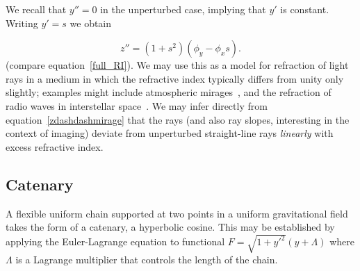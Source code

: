 \documentclass[pdflatex,sn-mathphys-num]{sn-jnl}%
\theoremstyle{thmstyleone}%
\theoremstyle{thmstyletwo}%
\theoremstyle{thmstylethree}%
\begin{document}
We recall that $y'' = 0$ in the unperturbed case, implying that $y'$
is constant.  Writing $y'= s$ we obtain

\begin{equation}
  z'' = (1+s^2)(\phi_y-\phi_xs).\label{zdashdashmirage}
\end{equation}
%
(compare equation~\ref{full_RI}).  We may use this as a model for
refraction of light rays in a medium in which the refractive index
typically differs from unity only slightly; examples might include
atmospheric mirages~\cite{trankle1999}, and the refraction of radio
waves in interstellar space~\cite{romani1986}.  We may infer directly
from equation~\ref{zdashdashmirage} that the rays (and also ray
slopes, interesting in the context of imaging) deviate from
unperturbed straight-line rays {\em linearly} with excess refractive
index.


%


\subsection{Catenary}

A flexible uniform chain supported at two points in a uniform
gravitational field takes the form of a catenary, a hyperbolic cosine.
This may be established by applying the Euler-Lagrange equation to
functional $F=\sqrt{1+y'^2}(y+\Lambda)$ where $\Lambda$ is a Lagrange
multiplier that controls the length of the chain.
\end{document}
